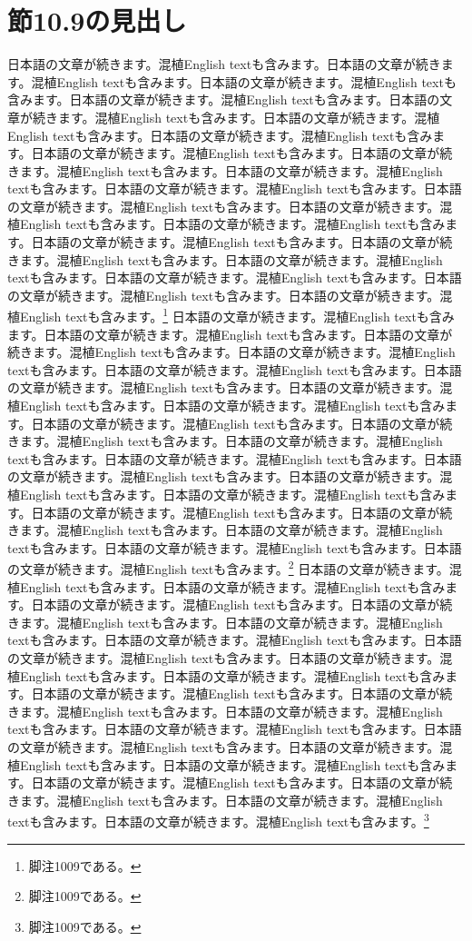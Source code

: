 \documentclass[pdflatex,book]{jlreq}
\begin{document}
\section{節10.9の見出し}
日本語の文章が続きます。混植English textも含みます。日本語の文章が続きます。混植English textも含みます。日本語の文章が続きます。混植English textも含みます。日本語の文章が続きます。混植English textも含みます。日本語の文章が続きます。混植English textも含みます。日本語の文章が続きます。混植English textも含みます。日本語の文章が続きます。混植English textも含みます。日本語の文章が続きます。混植English textも含みます。日本語の文章が続きます。混植English textも含みます。日本語の文章が続きます。混植English textも含みます。日本語の文章が続きます。混植English textも含みます。日本語の文章が続きます。混植English textも含みます。日本語の文章が続きます。混植English textも含みます。日本語の文章が続きます。混植English textも含みます。日本語の文章が続きます。混植English textも含みます。日本語の文章が続きます。混植English textも含みます。日本語の文章が続きます。混植English textも含みます。日本語の文章が続きます。混植English textも含みます。日本語の文章が続きます。混植English textも含みます。日本語の文章が続きます。混植English textも含みます。\footnote{脚注1009である。}
日本語の文章が続きます。混植English textも含みます。日本語の文章が続きます。混植English textも含みます。日本語の文章が続きます。混植English textも含みます。日本語の文章が続きます。混植English textも含みます。日本語の文章が続きます。混植English textも含みます。日本語の文章が続きます。混植English textも含みます。日本語の文章が続きます。混植English textも含みます。日本語の文章が続きます。混植English textも含みます。日本語の文章が続きます。混植English textも含みます。日本語の文章が続きます。混植English textも含みます。日本語の文章が続きます。混植English textも含みます。日本語の文章が続きます。混植English textも含みます。日本語の文章が続きます。混植English textも含みます。日本語の文章が続きます。混植English textも含みます。日本語の文章が続きます。混植English textも含みます。日本語の文章が続きます。混植English textも含みます。日本語の文章が続きます。混植English textも含みます。日本語の文章が続きます。混植English textも含みます。日本語の文章が続きます。混植English textも含みます。日本語の文章が続きます。混植English textも含みます。\footnote{脚注1009である。}
日本語の文章が続きます。混植English textも含みます。日本語の文章が続きます。混植English textも含みます。日本語の文章が続きます。混植English textも含みます。日本語の文章が続きます。混植English textも含みます。日本語の文章が続きます。混植English textも含みます。日本語の文章が続きます。混植English textも含みます。日本語の文章が続きます。混植English textも含みます。日本語の文章が続きます。混植English textも含みます。日本語の文章が続きます。混植English textも含みます。日本語の文章が続きます。混植English textも含みます。日本語の文章が続きます。混植English textも含みます。日本語の文章が続きます。混植English textも含みます。日本語の文章が続きます。混植English textも含みます。日本語の文章が続きます。混植English textも含みます。日本語の文章が続きます。混植English textも含みます。日本語の文章が続きます。混植English textも含みます。日本語の文章が続きます。混植English textも含みます。日本語の文章が続きます。混植English textも含みます。日本語の文章が続きます。混植English textも含みます。日本語の文章が続きます。混植English textも含みます。\footnote{脚注1009である。}
\end{document}

